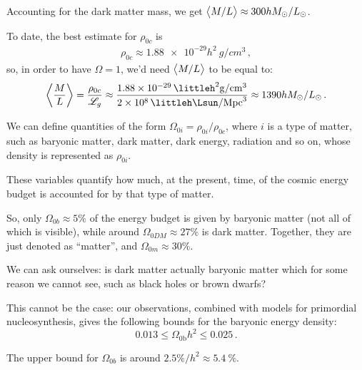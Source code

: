\documentclass[main.tex]{subfiles}
\begin{document}
Accounting for the dark matter mass, we get \(\expval{M/L} \approx 300 h M_\odot / L_\odot\).

To date, the best estimate for \(\rho_{0c}\) is 
%
\begin{align}
\rho_{0c} \approx \num{1.88e-29} h^2 \SI{}{g /cm^3}
\,,
\end{align}
%
so, in order to have \(\Omega = 1\), we'd need \(\expval{M/L}\) to be equal to:
%
\begin{align}
\expval{\frac{M}{L}} 
= \frac{\rho_{0c}}{\mathscr{L}_{g}}
\approx \frac{\SI{1.88e-29}{\littleh^2 g /cm^{3}}}{\SI{2e8}{\littleh \Lsun /Mpc^{3}}}
\approx 1390 h M_{\odot} / L_{\odot}
\,.
\end{align}


We can define quantities of the form \(\Omega_{0i}  = \rho_{0i} / \rho_{0c}\), where \(i\) is a type of matter, such as baryonic matter, dark matter, dark energy, radiation and so on, whose density is represented as \(\rho_{0i}\).

These variables quantify how much, at the present, time, of the cosmic energy budget is accounted for by that type of matter.

So, only \(\Omega_{0b} \approx 5\%\) of the energy budget is given by baryonic matter (not all of which is visible), while around \(\Omega_{0 DM} \approx 27\%\) is dark matter.
Together, they are just denoted as ``matter'', and \(\Omega_{0m} \approx 30 \%\).

We can ask ourselves: is dark matter actually baryonic matter which for some reason we cannot see, such as black holes or brown dwarfs?

This cannot be the case: our observations, combined with models for primordial nucleosynthesis,
gives the following bounds for the baryonic energy density: 
%
\begin{equation}
0.013 \leq \Omega_{\text{0b}} h^2 \leq 0.025
\,.
\end{equation}

The upper bound for \(\Omega_{0b}\) is around \(2.5\%/h^2 \approx \SI{5.4}{\percent}\).


\end{document}

